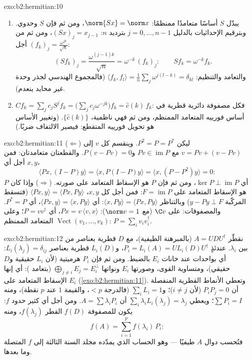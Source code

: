\begin{solution}{exo:b2:hermitian:10}
\begin{enumerate}
  \item يبدّل $S$ أساسًا متعامدًا ممنظمًا: $\norm{Sx} = \norm
        x$، ومن ثم فإن $S$ وحدوي. وبترقيم الإحداثيات بالدليل $j = 0,
        \dots, n-1$ بترديد $n$: $(Sx)_j = x_{j-1}$، ومن ثم من أجل
        $(f_k)_j = \frac{\omega^{jk}}{\sqrt n}$:
        \[
        (Sf_k)_j = \frac{\omega^{(j-1)k}}{\sqrt n}
        = \omega^{-k}\,(f_k)_j :
        \qquad Sf_k = \omega^{-k}f_k .
        \]
        والتعامد والتنظيم: $\langle f_k, f_l\rangle = \frac1n
        \sum_j \omega^{j(l-k)} = \delta_{kl}$ (فالمجموع الهندسي
        لجذر وحدة غير محايد ينعدم).
  \item $Cf_k = \sum_j c_j S^jf_k = \bigl(\sum_j
        c_j\omega^{-jk}\bigr)f_k = \widehat c(k)\,f_k$: فكل
        مصفوفة دائرية قطرية في أساس فورييه المتعامد الممنظم،
        ومن ثم فهي ناظمية،  $\{\widehat c(k)\}$. (وتغيير
        الأساس هو تحويل فورييه المتقطع:
        فيصير الالتفاف ضربًا.)
\end{enumerate}
\end{solution}

\begin{solution}{exo:b2:hermitian:11}
($\Leftarrow$) ليكن $P^2 = P = P^*$. وينقسم كل $v$ إلى $v = Pv
+ (v - Pv)$ مع $Pv \in \operatorname{im} P$ و$P(v - Pv) =
0$. والقطعتان متعامدتان: فمن أجل أي $x, y$،
\[
\langle Px, (I - P)y\rangle = \langle x, P(I-P)y\rangle
= \langle x, (P - P^2)y\rangle = 0 :
\]
أي $\ker P \perp \operatorname{im} P$، ومن ثم فإن $P$ هو الإسقاط
المتعامد على صورته. ($\Rightarrow$) وإذا كان $P$ هو
الإسقاط المتعامد على $F = \operatorname{im}P$: فمن أجل كل
$x, y$، $\langle Px, y\rangle = \langle Px, Py\rangle$ (فتسقط
المركّبة $y - Py \perp F$) وبالتناظر $\langle
x, Py\rangle = \langle Px, Py\rangle$: أي $\langle Px, y\rangle =
\langle x, Py\rangle$، أي $P^* = P$. والمصفوفات: على $\C v$
(مع $\norm v = 1$): $Px = v\,\langle v, x\rangle$، أي $P =
vv^\dagger$؛ وعلى $\operatorname{Vect}(v_1, \dots, v_k)$
المتعامد الممنظم: $P = \sum_i v_iv_i^\dagger$.
\end{solution}

\begin{solution}{exo:b2:hermitian:12}
نقطّر $A = U D U^\dagger$ (بالمبرهنة الطيفية)، مع $D$ قطرية
بعناصر من بين $\lambda_i$. عندئذٍ $P_i = L_i(A) = U
L_i(D)U^\dagger$، و$L_i(D)$ قطرية بعناصر
$L_i(\lambda_j) = \delta_{ij}$: أي بواحدات عند خانات
$E_i$ بالضبط. ومن ثم فإن $P_i$ هرميتية (لأن $L_i$ حقيقية و$D$ حقيقي)، ومتساوية القوى،
وصورتها $E_i$ ونواتها $\bigoplus_{j\neq i}E_j = E_i^\perp$
(بتعامد ): أي إنها الإسقاط المتعامد على
$E_i$ (\cref{exo:b2:hermitian:11}). وتعطي الأنماط القطرية المنفصلة
أن $P_iP_j = 0$ (لأن $i \neq j$)؛ و$\sum_i L_i = 1$ (فالدرجة $< p$،
والقيمة $1$ عند $p$ نقطة)، ومنه $\sum P_i = I$؛ ويعطي $\sum_i
\lambda_iL_i(\lambda_j) = \lambda_j$ أن $A = \sum
\lambda_iP_i$. ومن أجل أي كثير حدود $f$: يكون للمصفوفة $f(D)$ القطر
$f(\lambda_j)$، ومنه
\[
f(A) = \sum_{i=1}^{p} f(\lambda_i)\,P_i :
\]
فتُحسب دوال $A$ طيفيًا --- وهو الحساب الذي
يمدّده مجلد السنة الثالثة إلى $f$ المتصلة وما بعدها.
\end{solution}

